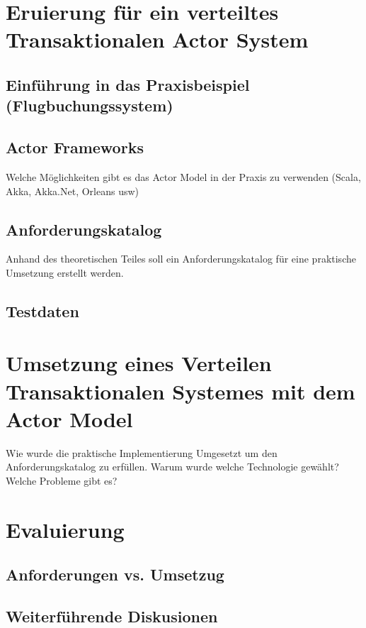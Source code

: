 
\chapter{Eruierung für ein verteiltes Transaktionalen Actor System }
\section{Einführung in das Praxisbeispiel (Flugbuchungssystem)}
\section{Actor Frameworks}\label{sec:ActorFrameworks}
Welche Möglichkeiten gibt es das Actor Model in der Praxis zu verwenden (Scala, Akka, Akka.Net, Orleans usw)

\section{Anforderungskatalog}
Anhand des theoretischen Teiles soll ein Anforderungskatalog für eine praktische Umsetzung erstellt werden.

\section{Testdaten}

\chapter{Umsetzung eines Verteilen Transaktionalen Systemes mit dem Actor Model}
Wie wurde die praktische Implementierung Umgesetzt um den Anforderungskatalog zu erfüllen. Warum wurde welche Technologie gewählt? Welche Probleme gibt es? 

\chapter{Evaluierung}
\section{Anforderungen vs. Umsetzug}
\section{Weiterführende Diskusionen}
